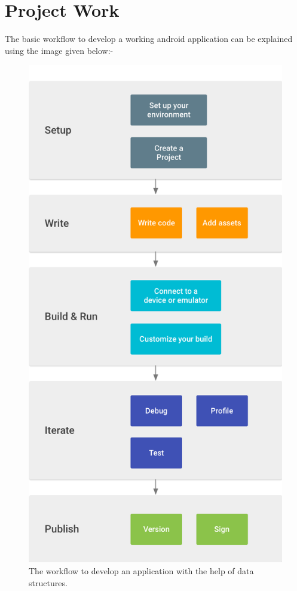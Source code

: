 \documentclass[11pt,a4paper]{report}
\begin{document}
		\section*{Project Work}
		\vskip 1cm
		The basic workflow to develop a working android application can be explained using the image given below:-
		\begin{figure}[H]
		    \centering
		    \includegraphics[scale=0.3]{developer-workflow_2x.png}
		    \caption{The workflow to develop an application with the help of data structures.}
		\end{figure}
\end{document}
